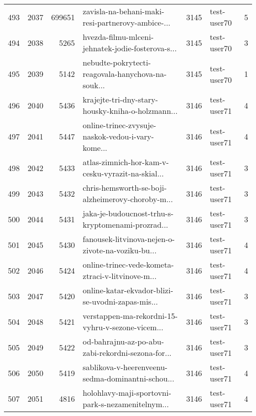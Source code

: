 \begin{tabular}{lrrlrlr}
493  &       2037 &   699651 &  zavisla-na-behani-maki-resi-partnerovy-ambice-... &     3145 &                  test-user70 &               5 \\
494  &       2038 &     5265 &  hvezda-filmu-mlceni-jehnatek-jodie-fosterova-s... &     3145 &                  test-user70 &               3 \\
495  &       2039 &     5142 &  nebudte-pokrytecti-reagovala-hanychova-na-souk... &     3145 &                  test-user70 &               1 \\
496  &       2040 &     5436 &  krajejte-tri-dny-stary-housky-kniha-o-holzmann... &     3146 &                  test-user71 &               4 \\
497  &       2041 &     5447 &  online-trinec-zvysuje-naskok-vedou-i-vary-kome... &     3146 &                  test-user71 &               4 \\
498  &       2042 &     5433 &  atlas-zimnich-hor-kam-v-cesku-vyrazit-na-skial... &     3146 &                  test-user71 &               3 \\
499  &       2043 &     5432 &  chris-hemsworth-se-boji-alzheimerovy-choroby-m... &     3146 &                  test-user71 &               3 \\
500  &       2044 &     5431 &  jaka-je-budoucnost-trhu-s-kryptomenami-prozrad... &     3146 &                  test-user71 &               3 \\
501  &       2045 &     5430 &  fanousek-litvinova-nejen-o-zivote-na-voziku-bu... &     3146 &                  test-user71 &               4 \\
502  &       2046 &     5424 &  online-trinec-vede-kometa-ztraci-v-litvinove-m... &     3146 &                  test-user71 &               4 \\
503  &       2047 &     5420 &  online-katar-ekvador-blizi-se-uvodni-zapas-mis... &     3146 &                  test-user71 &               3 \\
504  &       2048 &     5421 &  verstappen-ma-rekordni-15-vyhru-v-sezone-vicem... &     3146 &                  test-user71 &               3 \\
505  &       2049 &     5422 &  od-bahrajnu-az-po-abu-zabi-rekordni-sezona-for... &     3146 &                  test-user71 &               3 \\
506  &       2050 &     5419 &  sablikova-v-heerenveenu-sedma-dominantni-schou... &     3146 &                  test-user71 &               4 \\
507  &       2051 &     4816 &  holohlavy-maji-sportovni-park-s-nezamenitelnym... &     3146 &                  test-user71 &               4 \\

\end{tabular}
